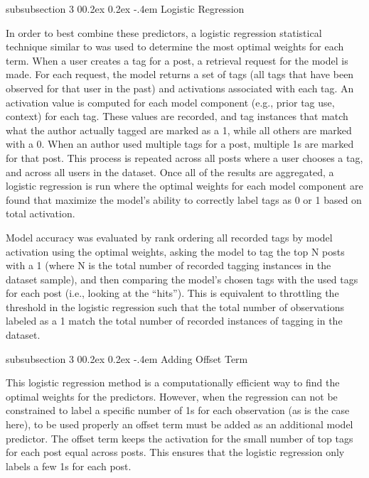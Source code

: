 \documentclass[man,floatsintext,donotrepeattitle]{apa6}
\makeatletter
\renewcommand{\subsubsection}{%
  \@startsection
  {subsubsection}%
  {3}%
  {\parindent}%
  {0\baselineskip \@plus 0.2ex \@minus 0.2ex}%
  {-.4em}%
  {\normalfont\normalsize\bfseries\addperi}}
\makeatother
\begin{document}
\subsubsection{Logistic Regression}

In order to best combine these predictors, a logistic regression statistical technique similar to \textcite{Stanley2013} was used to determine the most optimal weights for each term.
When a user creates a tag for a post, a retrieval request for the model is made.
For each request, the model returns a set of tags (all tags that have been observed for that user in the past) and activations associated with each tag.
An activation value is computed for each model component (e.g., prior tag use, context) for each tag.
These values are recorded, and tag instances that match what the author actually tagged are marked as a 1, while all others are marked with a 0.
When an author used multiple tags for a post, multiple 1s are marked for that post.
This process is repeated across all posts where a user chooses a tag, and across all users in the dataset.
Once all of the results are aggregated, a logistic regression is run where the optimal weights for each model component are found that maximize the model's ability to correctly label tags as 0 or 1 based on total activation.

Model accuracy was evaluated by rank ordering all recorded tags by model activation using the optimal weights,
asking the model to tag the top N posts with a 1 (where N is the total number of recorded tagging instances in the dataset sample),
and then comparing the model's chosen tags with the used tags for each post (i.e., looking at the ``hits'').
This is equivalent to throttling the threshold in the logistic regression such that the total number of observations labeled as a 1 match the total number of recorded instances of tagging in the dataset.

\subsubsection{Adding Offset Term}

This logistic regression method is a computationally efficient way to find the optimal weights for the predictors.
However, when the regression can not be constrained to label a specific number of 1s for each observation (as is the case here), to be used properly an offset term must be added as an additional model predictor.
The offset term keeps the activation for the small number of top tags for each post equal across posts.
This ensures that the logistic regression only labels a few 1s for each post.
\end{document}
